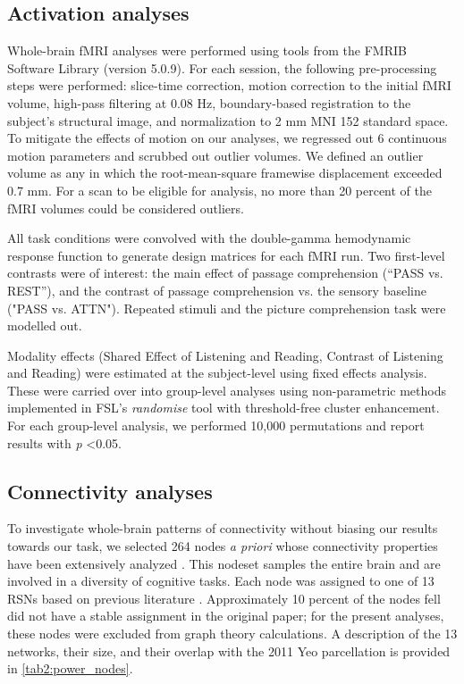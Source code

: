 \subsection{Activation analyses}

Whole-brain fMRI analyses were performed using tools from the FMRIB Software Library (version 5.0.9). For each session, the following pre-processing steps were performed:  slice-time correction, motion correction to the initial fMRI volume, high-pass filtering at 0.08 Hz, boundary-based registration to the subject's structural image, and normalization to 2 mm MNI 152 standard space. To mitigate the effects of motion on our analyses, we regressed out 6 continuous motion parameters and scrubbed out outlier volumes. We defined an outlier volume as any in which the root-mean-square framewise displacement exceeded 0.7 mm. For a scan to be eligible for analysis, no more than 20 percent of the fMRI volumes could be considered outliers.

All task conditions were convolved with the double-gamma hemodynamic response function to generate design matrices for each fMRI run. Two first-level contrasts were of interest: the main effect of passage comprehension (“PASS vs. REST”), and the contrast of passage comprehension vs. the sensory baseline ("PASS vs. ATTN"). Repeated stimuli and the picture comprehension task were modelled out.

Modality effects (Shared Effect of Listening and Reading, Contrast of Listening and Reading) were estimated at the subject-level using fixed effects analysis. These were carried over into group-level analyses using non-parametric methods implemented in FSL’s \textit{randomise} tool with threshold-free cluster enhancement. For each group-level analysis, we performed 10,000 permutations and report results with \textit{p} \textless 0.05. 

\subsection{Connectivity analyses}

To investigate whole-brain patterns of connectivity without biasing our results towards our task, we selected 264 nodes \textit{a priori} whose connectivity properties have been extensively analyzed \cite{Power2011}. This nodeset samples the entire brain and are involved in a diversity of cognitive tasks. Each node was assigned to one of 13 RSNs based on previous literature \cite{Power2013}. Approximately 10 percent of the nodes fell did not have a stable assignment in the original paper; for the present analyses, these nodes were excluded from graph theory calculations. A description of the 13 networks, their size, and their overlap with the 2011 Yeo parcellation is provided in \ref{tab2:power_nodes}. 

